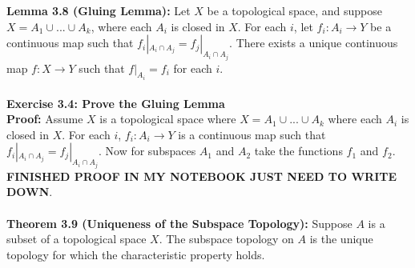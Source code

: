 \documentclass{article}
\begin{document}
  \textbf{Lemma 3.8 (Gluing Lemma):} Let $X$ be a topological space, and suppose $X=A_1\cup ...\cup A_k$, where each $A_i$ is closed in $X$. For each $i$, let $f_i:A_i\to Y$ be a continuous map such that $f_i|_{A_i\cap A_j}=f_j|_{A_i\cap A_j}$. There exists a unique continuous map $f:X\to Y$ such that $f|_{A_i}=f_i$ for each $i$.\\
  \\
  \textbf{Exercise 3.4: Prove the Gluing Lemma}\\
  \textbf{Proof:} Assume $X$ is a topological space where $X=A_1\cup...\cup A_k$ where each $A_i$ is closed in $X$. For each $i$, $f_i:A_i\to Y$ is a continuous map such that $f_i|_{A_i\cap A_j}=f_j|_{A_i\cap A_j}$. Now for subspaces $A_1$ and $A_2$ take the functions $f_1$ and $f_2$. \textbf{FINISHED PROOF IN MY NOTEBOOK JUST NEED TO WRITE DOWN}.
  \\
  \\
  \textbf{Theorem 3.9 (Uniqueness of the Subspace Topology):} Suppose $A$ is a subset of a topological space $X$. The subspace topology on $A$ is the unique topology for which the characteristic property holds.
\end{document}
